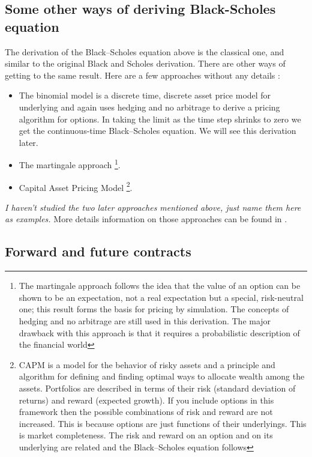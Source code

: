 \subsection{Some other ways of deriving Black-Scholes equation}
The derivation of the Black–Scholes equation above is the classical one, and similar to the original Black and Scholes derivation. There are other ways of getting to the same result. Here are a few approaches without any details \cite{pw_iqf2ed_2007}:
\begin{itemize}
    \setlength\itemsep{0em}
    \item The binomial model is a discrete time, discrete asset price model for underlying and again uses hedging and no arbitrage to derive a pricing algorithm for options. In taking the limit as the time step shrinks to zero we get the continuous-time Black–Scholes equation. We will see this derivation later.
    \item The martingale approach \footnote{The martingale approach follows the idea that the value of an option can be shown to be an expectation, not a real expectation but a special, risk-neutral one; this result forms the basis for pricing by simulation. The concepts of hedging and no arbitrage are still used in this derivation. The major drawback with this approach is that it requires a probabilistic description of the financial world}.  
    \item Capital Asset Pricing Model \footnote{CAPM is a model for the behavior of risky assets and a principle and algorithm for defining and finding optimal ways to allocate wealth among the assets. Portfolios are described in terms of their risk (standard deviation of returns) and reward (expected growth). If you include options in this framework then the possible combinations of risk and reward are not increased. This is because options are just functions of their underlyings. This is market completeness. The risk and reward on an option and on its underlying are related and the Black–Scholes equation follows}.
\end{itemize}

\textit{I haven't studied the two later approaches mentioned above, just name them here as examples.} More details information on those approaches can be found in \cite{ja_bsderivation_1998}.



\subsection{Forward and future contracts}
